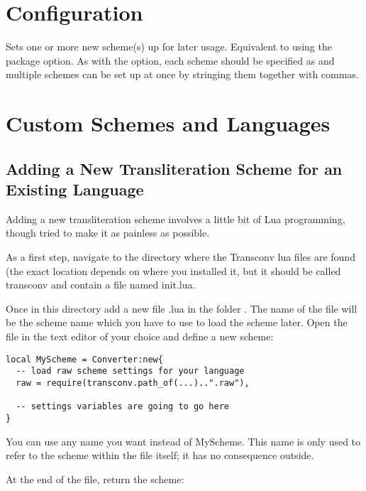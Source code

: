 \documentclass{ltxdockit}
\begin{document}
\section{Configuration}

\begin{ltxsyntax}

  Sets one or more new scheme(s) up for later usage. Equivalent to using the
   package option. As with the option, each scheme should be specified as
   and multiple schemes can be set up at once by
  stringing them together with commas.

\end{ltxsyntax}

\section{Custom Schemes and Languages}

\subsection{Adding a New Transliteration Scheme for an Existing Language}

Adding a new transliteration scheme involves a little bit of Lua programming,
though  tried to make it as painless as possible.

As a first step, navigate to the directory where the Transconv lua files are
found (the exact location depends on where you installed it, but it should be
called transconv and contain a file named init.lua.

Once in this directory add a new file .lua in the folder .
The name of the file will be the scheme name which you have to use to load the
scheme later. Open the file in the text editor of your choice and define a new
scheme:

\begin{lstlisting}
local MyScheme = Converter:new{
  -- load raw scheme settings for your language
  raw = require(transconv.path_of(...)..".raw"),

  -- settings variables are going to go here
}
\end{lstlisting}

You can use any name you want instead of MyScheme. This name is only used to
refer to the scheme within the file itself; it has no consequence outside.

At the end of the file, return the scheme:
\end{document}
